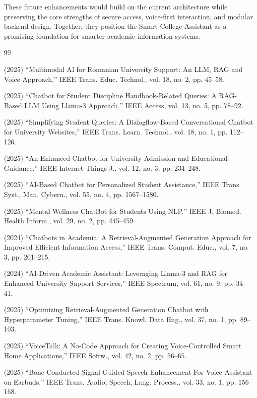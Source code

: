 \documentclass{article}
\begin{document}
These future enhancements would build on the current architecture while preserving the core strengths of secure access, voice-first interaction, and modular backend design. Together, they position the Smart College Assistant as a promising foundation for smarter academic information systems.

\begin{thebibliography}{99}

 (2025) ``Multimodal AI for Romanian University Support: An LLM, RAG and Voice Approach,'' IEEE Trans. Educ. Technol., vol. 18, no. 2, pp. 45--58.

 (2025) ``Chatbot for Student Discipline Handbook-Related Queries: A RAG-Based LLM Using Llama-3 Approach,'' IEEE Access, vol. 13, no. 5, pp. 78--92.

 (2025) ``Simplifying Student Queries: A Dialogflow-Based Conversational Chatbot for University Websites,'' IEEE Trans. Learn. Technol., vol. 18, no. 1, pp. 112--126.

 (2025) ``An Enhanced Chatbot for University Admission and Educational Guidance,'' IEEE Internet Things J., vol. 12, no. 3, pp. 234--248.

 (2025) ``AI-Based Chatbot for Personalized Student Assistance,'' IEEE Trans. Syst., Man, Cybern., vol. 55, no. 4, pp. 1567--1580.

 (2025) ``Mental Wellness ChatBot for Students Using NLP,'' IEEE J. Biomed. Health Inform., vol. 29, no. 2, pp. 445--459.

 (2024) ``Chatbots in Academia: A Retrieval-Augmented Generation Approach for Improved Efficient Information Access,'' IEEE Trans. Comput. Educ., vol. 7, no. 3, pp. 201--215.

 (2024) ``AI-Driven Academic Assistant: Leveraging Llama-3 and RAG for Enhanced University Support Services,'' IEEE Spectrum, vol. 61, no. 9, pp. 34--41.

 (2025) ``Optimizing Retrieval-Augmented Generation Chatbot with Hyperparameter Tuning,'' IEEE Trans. Knowl. Data Eng., vol. 37, no. 1, pp. 89--103.

 (2025) ``VoiceTalk: A No-Code Approach for Creating Voice-Controlled Smart Home Applications,'' IEEE Softw., vol. 42, no. 2, pp. 56--65.

 (2025) ``Bone Conducted Signal Guided Speech Enhancement For Voice Assistant on Earbuds,'' IEEE Trans. Audio, Speech, Lang. Process., vol. 33, no. 1, pp. 156--168.


\end{thebibliography}
\end{document}
